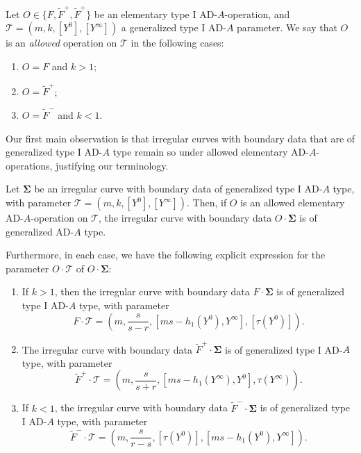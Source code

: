 \documentclass[11pt,a4paper]{amsart}
\numberwithin{equation}{section}
\begin{document}
\begin{definition}
Let $O\in \{F, \widetilde F^+, \widetilde F^+\}$ be an elementary type I AD-$A$-operation, and $\mathcal T=(m, k, [Y^0], [Y^{\infty}])$ a generalized type I AD-$A$ parameter. We say that $O$ is an \emph{allowed} operation on $\mathcal T$ in the following cases:
\begin{enumerate}
\item $O=F$ and $k>1$;
\item $O=\widetilde F^+$;
\item $O=\widetilde F^-$ and $k<1$.
\end{enumerate} 
\end{definition}

Our first main observation is that irregular curves with boundary data that are of generalized type I AD-$A$ type remain so under allowed elementary AD-$A$-operations, justifying our terminology.

\begin{proposition}
\label{prop:transformation_parameter_elementary_operation_type_I}
Let $\bm\Sigma$ be an irregular curve with boundary data of generalized type I AD-$A$ type, with parameter $\mathcal T=(m,k,[Y^0], [Y^\infty])$. Then, if $O$ is an allowed elementary AD-$A$-operation on $\mathcal T$, the irregular curve with boundary data $O\cdot \bm\Sigma$ is of generalized AD-$A$ type. 

Furthermore, in each case, we have the following explicit expression for the parameter $O\cdot \mathcal T$ of $O\cdot\bm\Sigma$:
\begin{enumerate}
\item If $k>1$, then the irregular curve with boundary data $F\cdot \bm\Sigma$ is  of generalized type I AD-$A$ type, with parameter
\begin{equation}
F\cdot \mathcal T=\left(m,\frac{s}{s-r},[ms-h_1(Y^0),Y^{\infty}], [\tau(Y^{0})]\right).
\end{equation}
\item The irregular curve with boundary data $\widetilde F^+\cdot \bm\Sigma$ is of generalized type I AD-$A$ type, with parameter
\begin{equation}
\widetilde F^+\cdot\mathcal T=\left(m,\frac{s}{s+r},[ms-h_1(Y^\infty),Y^{0}], \tau(Y^{\infty})\right).
\end{equation}
\item If $k<1$, the irregular curve with boundary data $\widetilde F^-\cdot \bm\Sigma$ is of  generalized type I AD-$A$ type, with parameter
\begin{equation}
\widetilde F^-\cdot\mathcal T=\left(m,\frac{s}{r-s},[\tau(Y^{0})], [ms-h_1(Y^0),Y^{\infty}]\right). 
\end{equation}
\end{enumerate}
\end{proposition}
\end{document}
